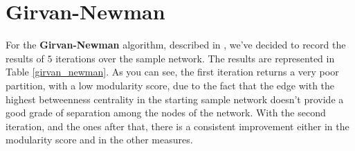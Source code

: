 
\section{Girvan-Newman} %
\label{sec:girvan_newman}
    For the \textbf{Girvan-Newman} algorithm, described in \cite{girvan_newman}, we've decided to record
    the results of $5$ iterations over the sample network. The results are represented in Table
    \ref{girvan_newman}. As you can see, the first iteration returns a very poor partition, with a low modularity
    score, due to the fact that the edge with the highest betweenness centrality in the starting sample network
    doesn't provide a good grade of separation among the nodes of the network. With the second iteration, and the
    ones after that, there is a consistent improvement either in the modularity score and in the other measures.
